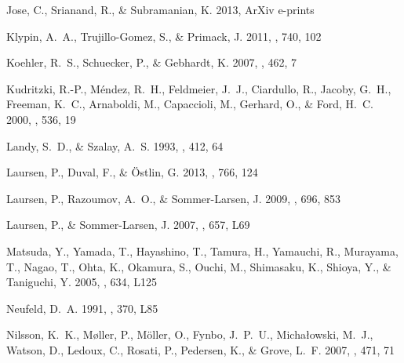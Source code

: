 \documentclass{emulateapj}
\begin{document}
\begin{thebibliography}{36}
{Jose}, C., {Srianand}, R., \& {Subramanian}, K. 2013, ArXiv e-prints

{Klypin}, A.~A., {Trujillo-Gomez}, S., \& {Primack}, J. 2011, \apj, 740, 102

{Koehler}, R.~S., {Schuecker}, P., \& {Gebhardt}, K. 2007, \aap, 462, 7

{Kudritzki}, R.-P., {M{\'e}ndez}, R.~H., {Feldmeier}, J.~J., {Ciardullo}, R.,
  {Jacoby}, G.~H., {Freeman}, K.~C., {Arnaboldi}, M., {Capaccioli}, M.,
  {Gerhard}, O., \& {Ford}, H.~C. 2000, \apj, 536, 19

{Landy}, S.~D., \& {Szalay}, A.~S. 1993, \apj, 412, 64

{Laursen}, P., {Duval}, F., \& {{\"O}stlin}, G. 2013, \apj, 766, 124

{Laursen}, P., {Razoumov}, A.~O., \& {Sommer-Larsen}, J. 2009, \apj, 696, 853

{Laursen}, P., \& {Sommer-Larsen}, J. 2007, \apjl, 657, L69

{Matsuda}, Y., {Yamada}, T., {Hayashino}, T., {Tamura}, H., {Yamauchi}, R.,
  {Murayama}, T., {Nagao}, T., {Ohta}, K., {Okamura}, S., {Ouchi}, M.,
  {Shimasaku}, K., {Shioya}, Y., \& {Taniguchi}, Y. 2005, \apjl, 634, L125

{Neufeld}, D.~A. 1991, \apjl, 370, L85

{Nilsson}, K.~K., {M{\o}ller}, P., {M{\"o}ller}, O., {Fynbo}, J.~P.~U.,
  {Micha{\l}owski}, M.~J., {Watson}, D., {Ledoux}, C., {Rosati}, P.,
  {Pedersen}, K., \& {Grove}, L.~F. 2007, \aap, 471, 71


\end{thebibliography}
\end{document}
